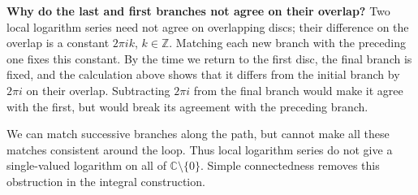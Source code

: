 \documentclass[11pt]{article}
\theoremstyle{plain}
\theoremstyle{definition}
\theoremstyle{remark}
\numberwithin{equation}{section}
\newcommand{\C}{\mathbb{C}}
\newcommand{\Z}{\mathbb{Z}}
\begin{document}
\textbf{Why do the last and first branches not agree on their overlap?}
Two local logarithm series need not agree on overlapping discs; their
difference on the overlap is a constant $2\pi i k$, $k\in\Z$. Matching
each new branch with the preceding one fixes this constant. By the time
we return to the first disc, the final branch is fixed, and the calculation
above shows that it differs from the initial branch by $2\pi i$ on their
overlap. Subtracting $2\pi i$ from the final branch would make it agree
with the first, but would break its agreement with the preceding branch.

We can match successive branches along the path, but cannot make all
these matches consistent around the loop. Thus local logarithm series
do not give a single-valued logarithm on all of $\C\setminus\{0\}$.
Simple connectedness removes this obstruction in the integral construction.
\end{document}
